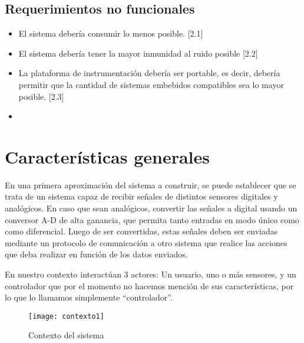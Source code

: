 
\subsection{Requerimientos no funcionales} %
\label{sub:requerimientos_no_funcionales}

\begin{itemize}
    \item El sistema debería consumir lo menos posible. [2.1]
    \item El sistema debería tener la mayor inmunidad al ruido posible [2.2]
	\item La plataforma de instrumentación debería ser portable, es decir, debería permitir que la cantidad de sistemas embebidos compatibles sea lo mayor posible. [2.3]
	\item 
\end{itemize}



\section{Características generales} %
\label{sec:caracteristicas_generales}

En una primera aproximación del sistema a construir, se puede establecer que se trata de un sistema capaz de recibir señales de distintos sensores digitales y analógicos. En caso que sean analógicos, convertir las señales a digital usando un conversor A-D de alta ganancia, que permita tanto entradas en modo único como como diferencial. Luego de ser convertidas, estas señales deben ser enviadas mediante un protocolo de comunicación a otro sistema que realice las acciones que deba realizar en función de los datos enviados.

En nuestro contexto interactúan 3 actores: Un usuario, uno o más sensores, y un controlador que por el momento no hacemos mención de sus características, por lo que lo llamamos simplemente ``controlador''.

\begin{figure}[h]
  \centering
  \texttt{[image: contexto1]}
  \caption{Contexto del sistema}\label{fig:contexto1}
\end{figure}


